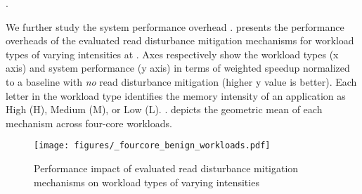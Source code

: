 
.

We further study the system performance overhead .
 presents the performance overheads of the evaluated read disturbance mitigation mechanisms for  workload types of varying intensities at .
Axes respectively show the workload types (x axis) and system performance (y axis) in terms of weighted speedup normalized to a baseline with \emph{no} read disturbance mitigation (higher y value is better).
Each letter in the workload type identifies the memory intensity of an application as High (H), Medium (M), or Low (L).
.
 depicts the geometric mean of each mechanism across  four-core workloads.

\begin{figure}[h]
\centering
\texttt{[image: figures/\_fourcore\_benign\_workloads.pdf]}
\caption{Performance impact of evaluated read disturbance mitigation mechanisms on  workload types of varying  intensities}
\label{fig:benign_workloads}
\end{figure}

